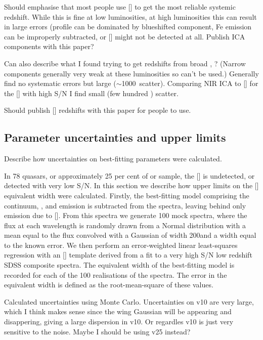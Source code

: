 Should emphasise that most people use [] to get the most reliable systemic redshift. 
While this is fine at low luminosities, at high luminosities this can result in large errors (profile can be dominated by blueshifted component, Fe emission can be improperly subtracted, or [] might not be detected at all. 
Publish ICA components with this paper? 

Can also describe what I found trying to get redshifts from broad \hans, \hbns? (Narrow components generally very weak at these luminosities so can't be used.)
Generally find no systematic errors but large ($\sim$1000\kms\, scatter).
Comparing NIR ICA to [] for the [] with high S/N I find small (few hundred \kms) scatter. 

Should publish [] redshifts with this paper for people to use. 
 

\subsection{Parameter uncertainties and upper limits}

Describe how uncertainties on best-fitting parameters were calculated. 

In 78 quasars, or approximately 25 per cent of or sample, the [] is undetected, or detected with very low S/N. 
In this section we describe how upper limits on the [] equivalent width were calculated. 
Firstly, the best-fitting model comprising the continuum, , and \hb emission is subtracted from the spectra, leaving behind only emission due to []. 
From this spectra we generate 100 mock spectra, where the flux at each wavelength is randomly drawn from a Normal distribution with a mean equal to the flux convolved with a Gaussian of width 200\kms and a width equal to the known error. 
We then perform an error-weighted linear least-squares regression with an [] template derived from a fit to a very high S/N low redshift SDSS composite spectra. 
The equivalent width of the best-fitting model is recorded for each of the 100 realisations of the spectra. 
The error in the equivalent width is defined as the root-mean-square of these values.

Calculated uncertainties using Monte Carlo. 
Uncertainties on v10 are very large, which I think makes sense since the wing Gaussian will be appearing and disappering, giving a large dispersion in v10. Or regardles v10 is just very sensitive to the noise. 
Maybe I should be using v25 instead? 

